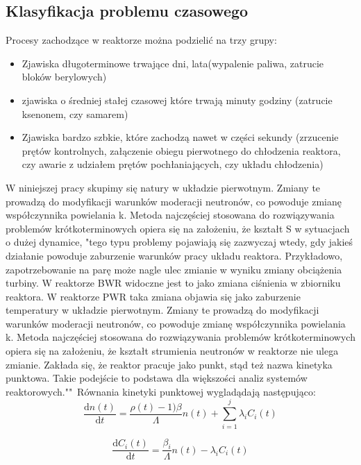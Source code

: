 \subsection{Klasyfikacja problemu czasowego}
Procesy zachodzące w reaktorze można podzielić na trzy grupy:
\begin{itemize} 
\item Zjawiska długoterminowe trwające dni, lata(wypalenie paliwa, zatrucie bloków berylowych)
\item zjawiska o średniej stałej czasowej które trwają minuty godziny (zatrucie ksenonem, czy samarem) 
\item Zjawiska bardzo szbkie, które zachodzą nawet w części sekundy (zrzucenie prętów kontrolnych, załączenie obiegu pierwotnego do chłodzenia reaktora, czy awarie z udziałem prętów pochłaniających, czy układu chłodzenia)
\end{itemize}
W niniejszej pracy skupimy się natury w układzie pierwotnym. Zmiany te prowadzą do modyfikacji warunków moderacji
neutronów, co powoduje zmianę współczynnika powielania k. Metoda najczęściej stosowana do rozwiązywania problemów krótkoterminowych opiera się na założeniu, że kształt S w sytuacjach o dużej dynamice, "tego typu problemy pojawiają się zazwyczaj wtedy, gdy jakieś działanie powoduje zaburzenie warunków pracy układu reaktora.
Przykładowo, zapotrzebowanie na parę może nagle ulec zmianie w wyniku zmiany obciążenia turbiny.
W reaktorze BWR widoczne jest to jako zmiana ciśnienia w zbiorniku reaktora.
W reaktorze PWR taka zmiana objawia się jako zaburzenie temperatury w układzie pierwotnym.
Zmiany te prowadzą do modyfikacji warunków moderacji neutronów, co powoduje zmianę współczynnika powielania k.
Metoda najczęściej stosowana do rozwiązywania problemów krótkoterminowych opiera się na założeniu, że kształt strumienia neutronów w reaktorze nie ulega zmianie. Zakłada się, że reaktor pracuje jako punkt, stąd też nazwa kinetyka punktowa. Takie podejście to podstawa dla większości analiz systemów reaktorowych."\cite{Lamarsh}"
\,Równania kinetyki punktowej wygladądają następująco: 
\begin{equation}
	\frac{\mathrm{d}n(t)}{\mathrm{d}t}=\frac{\rho(t)-1)\beta}{\Lambda}n(t)+\sum_{i=1}^{j} \lambda_iC_i(t) 
	\label{nodt}
\end{equation}

\begin{equation}
	\frac{\mathrm{d}C_i(t)}{\mathrm{d}t}=\frac{\beta_i}{\Lambda}n(t)-\lambda_iC_i(t) 
	\label{ciodt}
\end{equation}

